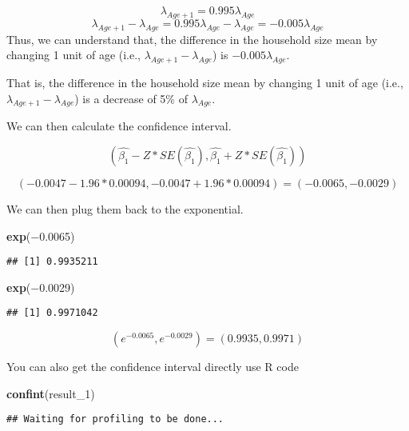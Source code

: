 \documentclass[]{book}
\newenvironment{Shaded}{\begin{snugshade}}{\end{snugshade}}
\newcommand{\DecValTok}[1]{\textcolor[rgb]{0.00,0.00,0.81}{#1}}
\newcommand{\FloatTok}[1]{\textcolor[rgb]{0.00,0.00,0.81}{#1}}
\newcommand{\KeywordTok}[1]{\textcolor[rgb]{0.13,0.29,0.53}{\textbf{#1}}}
\newcommand{\NormalTok}[1]{#1}
\begin{document}
\[\lambda_{Age+1} =0.995 \lambda_{Age}\]
\[\lambda_{Age+1} - \lambda_{Age}=0.995 \lambda_{Age}- \lambda_{Age}=-0.005 \lambda_{Age}\]
Thus, we can understand that, the difference in the household size mean by changing 1 unit of age (i.e., \(\lambda_{Age+1} - \lambda_{Age}\)) is \(-0.005 \lambda_{Age}\).

That is, the difference in the household size mean by changing 1 unit of age (i.e., \(\lambda_{Age+1} - \lambda_{Age}\)) is a decrease of 5\% of \(\lambda_{Age}\).

We can then calculate the confidence interval.

\[(\hat{\beta_1}-Z*SE(\hat{\beta_1}), \hat{\beta_1}+Z*SE(\hat{\beta_1}))\]

\[(-0.0047-1.96*0.00094,-0.0047+1.96*0.00094)=(−0.0065,−0.0029)\]

We can then plug them back to the exponential.

\begin{Shaded}
\begin{Highlighting}[]
\KeywordTok{exp}\NormalTok{(−}\FloatTok{0.0065}\NormalTok{)}
\end{Highlighting}
\end{Shaded}

\begin{verbatim}
## [1] 0.9935211
\end{verbatim}

\begin{Shaded}
\begin{Highlighting}[]
\KeywordTok{exp}\NormalTok{(−}\FloatTok{0.0029}\NormalTok{)}
\end{Highlighting}
\end{Shaded}

\begin{verbatim}
## [1] 0.9971042
\end{verbatim}

\[(e^{−0.0065},e^{−0.0029})=(0.9935,0.9971)\]

You can also get the confidence interval directly use R code

\begin{Shaded}
\begin{Highlighting}[]
\KeywordTok{confint}\NormalTok{(result_}\DecValTok{1}\NormalTok{)}
\end{Highlighting}
\end{Shaded}

\begin{verbatim}
## Waiting for profiling to be done...
\end{verbatim}
\end{document}
